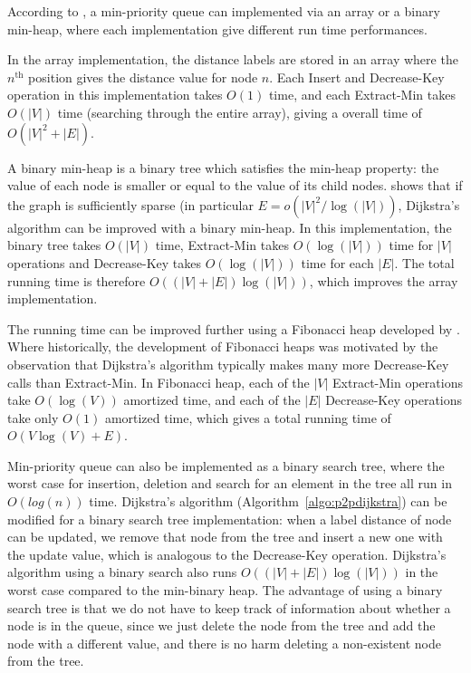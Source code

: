According to \citet{Cormen},
a min-priority queue can implemented via an array or a binary min-heap, where each implementation give different run time performances.

In the array implementation,
the distance labels are stored in an array where the $n^{\text{th}}$ position gives the distance value for node $n$.
Each Insert and Decrease-Key operation in this implementation takes $O(1)$ time, and each Extract-Min takes $O(|V|)$ time (searching through the entire array), giving a overall time of $O(|V|^2 + |E|)$.

A binary min-heap is a binary tree which satisfies the min-heap property:
the value of each node is smaller or equal to the value of its child nodes.
\citet{Cormen} shows that if the graph is sufficiently sparse (in particular $E = o(|V|^2/\log(|V|))$, Dijkstra's algorithm can be improved with a binary min-heap. In this implementation, the binary tree takes $O(|V|)$ time, Extract-Min takes $O(\log(|V|))$ time for $|V|$ operations and Decrease-Key takes $O(\log(|V|))$ time for each $|E|$. The total running time is therefore $O((|V|+|E|)\log(|V|))$, which improves the array implementation.

The running time can be improved further using a Fibonacci heap
developed by \citet{Fredman}.
Where historically, the development of Fibonacci heaps was motivated by the observation that Dijkstra's algorithm typically makes many more Decrease-Key calls than Extract-Min.
In Fibonacci heap, each of the $|V|$ Extract-Min operations take $O(\log(V))$ amortized time,
and each of the $|E|$ Decrease-Key operations take only $O(1)$ amortized time,
which gives a total running time of $O(V\log(V)+E)$.

Min-priority queue can also be implemented as a binary search tree,
where the worst case for insertion, deletion and search for an element in the tree all run in $O(log(n))$ time.
Dijkstra's algorithm (Algorithm~\ref{algo:p2pdijkstra}) can be modified for a binary search tree implementation: when a label distance of node can be updated, we remove that node from the tree and insert a new one with the update value, which is analogous to the Decrease-Key operation.
Dijkstra's algorithm using a binary search also runs $O((|V|+|E|)\log(|V|))$ in the worst case compared to the min-binary heap.
The advantage of using a binary search tree is that we do not have to keep track of information about whether a node is in the queue,
since we just delete the node from the tree and add the node with a different value, and there is no harm deleting a non-existent node from the tree.

